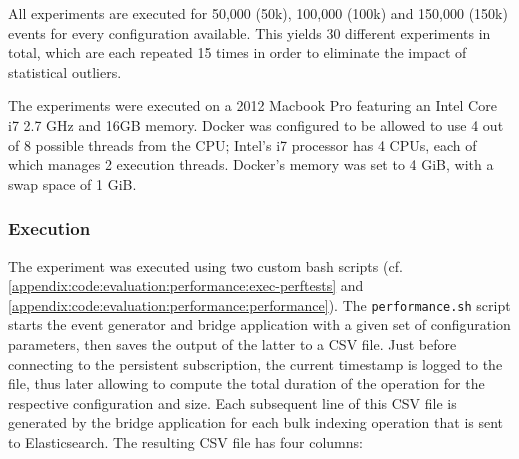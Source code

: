 \begin{table}
\caption{Configuration table}
\centering
{}
\label{table:configs}
\end{table}

All experiments are executed for 50,000 (50k), 100,000 (100k) and 150,000 (150k) events for every configuration available.
This yields 30 different experiments in total, which are each repeated 15 times in order to eliminate the impact of statistical outliers.

The experiments were executed on a 2012 Macbook Pro featuring an Intel Core i7 2.7 GHz and 16GB memory.
Docker was configured to be allowed to use 4 out of 8 possible threads from the CPU; Intel's i7 processor has 4 CPUs, each of which manages 2 execution threads.
Docker's memory was set to 4 GiB, with a swap space of 1 GiB.

\subsubsection{Execution}

The experiment was executed using two custom bash scripts (cf. \cref{appendix:code:evaluation:performance:exec-perftests} and \cref{appendix:code:evaluation:performance:performance}).
The \texttt{performance.sh} script starts the event generator and bridge application with a given set of configuration parameters, then saves the output of the latter to a CSV file.
Just before connecting to the persistent subscription, the current timestamp is logged to the file, thus later allowing to compute the total duration of the operation for the respective configuration and size.
Each subsequent line of this CSV file is generated by the bridge application for each bulk indexing operation that is sent to Elasticsearch.
The resulting CSV file has four columns:

